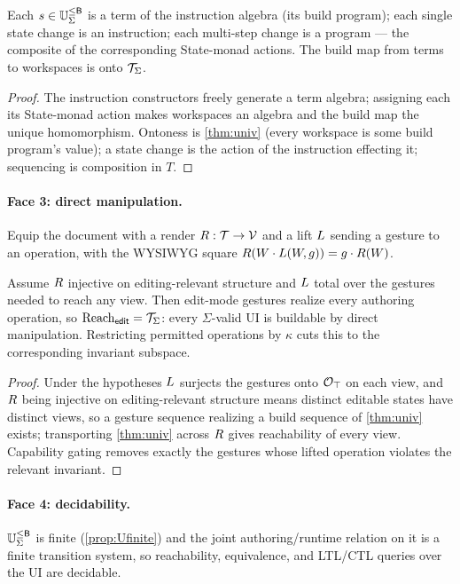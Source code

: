 \documentclass[../uxoxo-main]{subfiles}
\begin{document}
\begin{proposition}\label{prop:instr}
Each $s\in\mathbb{U}_{\Sigma}^{\le \mathsf{B}}$ is a term of the instruction algebra (its build program); each
single state change is an instruction; each multi-step change is a program ---
the composite of the corresponding State-monad actions. The build map from terms
to workspaces is onto $\mathcal{T}_\Sigma$.
\end{proposition}

\begin{proof}
The instruction constructors freely generate a term algebra; assigning each its
State-monad action makes workspaces an algebra and the build map the unique
homomorphism. Ontoness is \cref{thm:univ} (every workspace is some build
program's value); a state change is the action of the instruction effecting it;
sequencing is composition in $T$.
\end{proof}

\paragraph{Face 3: direct manipulation.}
Equip the document with a render $R:\mathcal{T}\to\mathcal{V}$ and a lift $L$
sending a gesture to an operation, with the WYSIWYG square
$R(W\cdot L(W,g))=g\cdot R(W)$.

\begin{theorem}\label{thm:dm}
Assume $R$ injective on editing-relevant structure and $L$ total over
the gestures needed to reach any view. Then edit-mode gestures realize every
authoring operation, so $\operatorname{Reach}_{\mathsf{edit}}=\mathcal{T}_\Sigma$: every $\Sigma$-valid
UI is buildable by direct manipulation. Restricting permitted operations by
$\kappa$ cuts this to the corresponding invariant subspace.
\end{theorem}

\begin{proof}
Under the hypotheses $L$ surjects the gestures onto $\mathcal{O}_\top$ on each view,
and $R$ being injective on editing-relevant structure means distinct
editable states have distinct views, so a gesture sequence realizing a build
sequence of \cref{thm:univ} exists; transporting \cref{thm:univ} across $R$
gives reachability of every view. Capability gating removes exactly the gestures
whose lifted operation violates the relevant invariant.
\end{proof}

\paragraph{Face 4: decidability.}
\begin{corollary}[Decidability]\label{cor:dec}
$\mathbb{U}_{\Sigma}^{\le \mathsf{B}}$ is finite (\cref{prop:Ufinite}) and the joint authoring/runtime relation
on it is a finite transition system, so reachability, equivalence, and LTL/CTL
queries over the UI are decidable.
\end{corollary}
\end{document}
